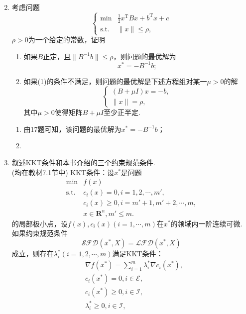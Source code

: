 \begin{enumerate}
\begin{align*}
    \end{align*}
    \item 考虑问题
    \[\begin{cases}
        \min & \displaystyle\frac{1}{2}x^{\mathrm{T}}Bx+b^{\mathrm{T}}x+c\\
        \mathrm{s.t.} & \|x\| \leqslant \rho,
    \end{cases}\]$\rho>0$为一个给定的常数，证明
    \begin{enumerate}[label=(\arabic*)]
        \item 如果$B$正定，且$\|B^{-1}b\| \leqslant \rho$，则问题的最优解为\[x^*=-B^{-1}b;\]
        \item 如果(1)的条件不满足，则问题的最优解是下述方程组对某一$\mu>0$的解\[\begin{cases}
            (B+\mu I)x=-b,\\\|x\| = \rho,
        \end{cases}\]其中$\mu>0$使得矩阵$B+\mu I$至少正半定.
    \end{enumerate}
    \pro
    \begin{enumerate}[label=(\arabic*)]
        \item 由17题可知，该问题的最优解为$x^*=-B^{-1}b$；
        \item \omitted
    \end{enumerate}
    \item 叙述KKT条件和本书介绍的三个约束规范条件.\\
    \sol (均在教材7.1节中) KKT条件：设$x^*$是问题
    \[\begin{array}{ll}
        \min & f(x)\\
        \mathrm{s.t.} & c_i(x) =0, i=1,2,\cdots,m',\\
        & c_i(x) \geqslant 0, i =m'+1,m'+2,\cdots,m,\\
        & x \in \mathbf{R}^n,m' \leqslant m.
    \end{array}\]
    的局部极小点，设$f(x),c_i(x)(i=1,\cdots,m)$在$x^*$的领域内一阶连续可微. 如果约束规范条件\[\mathcal{SFD}(x^*,X)=\mathcal{LFD}(x^*,X)\]成立，则存在$\lambda_i^*(i=1,2,\cdots,m)$满足KKT条件：
    \[\begin{array}{ll}
        & \displaystyle\nabla f(x^*)=\sum_{i=1}^m \lambda_i^* \nabla c_i(x^*),\\
        & c_i(x^*) = 0, i \in \mathcal{E},\\
        & c_i(x^*) \geqslant 0, i \in \mathcal{I},\\
        & \lambda_i^* \geqslant 0, i \in \mathcal{I},\\

\end{array}\]
\end{enumerate}

